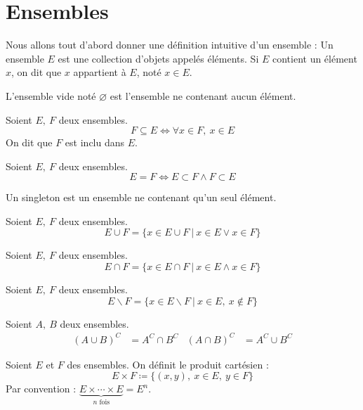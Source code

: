 \chapter{Ensembles}
Nous allons tout d'abord donner une définition intuitive d'un ensemble : Un ensemble $E$ est une collection d'objets appelés éléments. Si $E$ contient un élément $x$, on dit que $x$ appartient à $E$, noté $x \in E$.

\begin{definition}
  L'ensemble vide noté $\varnothing$ est l'ensemble ne contenant aucun élément.
\end{definition}

\begin{definition}[Inclusion]
  Soient $E,\ F$ deux ensembles.
  $$F \subseteq E \iff \forall x \in F,\ x \in E$$
  On dit que $F$ est inclu dans $E$.
\end{definition}

\begin{definition}
  Soient $E,\ F$ deux ensembles.
  $$E = F \iff E \subset F \land F \subset E$$
\end{definition}

\begin{definition}[Singleton]
  Un singleton est un ensemble ne contenant qu'un seul élément.
\end{definition}

\begin{definition}
  Soient $E,\ F$ deux ensembles.
  \[ E \cup F = \{ x \in E \cup F \ | \ x \in E \lor x \in F \} \]
\end{definition}

\begin{definition}
  Soient $E,\ F$ deux ensembles.
  \[ E \cap F = \{ x \in E \cap F \ | \ x \in E \land x \in F \} \]
\end{definition}

\begin{definition}
  Soient $E,\ F$ deux ensembles.
  \[ E \backslash F = \{ x \in E \backslash F \ | \ x \in E,\ x \notin F \} \]
\end{definition}

\begin{proposition}
  Soient $A,\ B$ deux ensembles.
  \begin{align*}
    (A \cup B)^{C} &= A^{C} \cap B^{C} & (A \cap B)^{C} &= A^{C} \cup B^{C}
  \end{align*}
\end{proposition}

\begin{definition}
    Soient $E$ et $F$ des ensembles. On définit le produit cartésien :
    \[ E \times F \coloneqq \{ (x, y),\ x \in E,\ y \in F \} \]
    Par convention : $\underbrace{E \times \cdots \times E}_{n \text{ fois}} = E^n$.
\end{definition}
